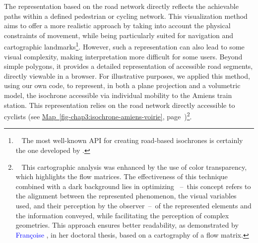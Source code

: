 \begin{refsegment}
The representation based on the road network directly reflects the achievable paths within a defined pedestrian or cycling network. This visualization method aims to offer a more realistic approach by taking into account the physical constraints of movement, while being particularly suited for navigation and cartographic landmarks\footnote{~
    The most well-known \acrfull{API} for creating road-based isochrones is certainly the one developed by \textcolor{blue}{\textcite{graphhopper_visualization_2018}}.
}. However, such a representation can also lead to some visual complexity, making interpretation more difficult for some users. Beyond simple polygons, it provides a detailed representation of accessible road segments, directly viewable in a browser. For illustrative purposes, we applied this method, using our own code, to represent, in both a plane projection and a volumetric model, the isochrone accessible via individual mobility to the Amiens train station. This representation relies on the road network directly accessible to cyclists (see \hyperref[fig-chap3:isochrone-amiens-voirie]{Map~\ref{fig-chap3:isochrone-amiens-voirie}}, page~\pageref{fig-chap3:isochrone-amiens-voirie})\footnote{~
    This cartographic analysis was enhanced by the use of color transparency, which highlights the flow matrices. The effectiveness of this technique combined with a dark background lies in optimizing ~–~this concept refers to the alignment between the represented phenomenon, the visual variables used, and their perception by the observer~–~of the represented elements and the information conveyed, while facilitating the perception of complex geometries. This approach ensures better readability, as demonstrated by \textcolor{blue}{Françoise} \textcolor{blue}{\textcite[226]{bahoken_contribution_2016}}, in her doctoral thesis, based on a cartography of a flow matrix.
}.%


\end{refsegment}
